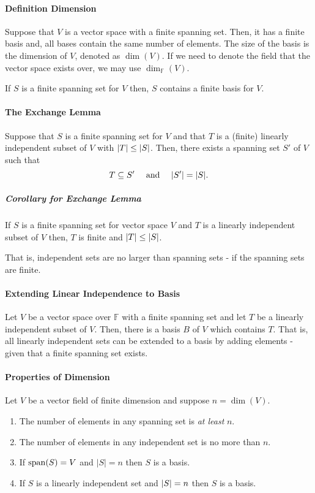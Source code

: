 \paragraph{Definition Dimension}
Suppose that \(V\) is a vector space with a finite spanning set. Then,
it has a finite basis and, all bases contain the same number of elements.
The size of the basis is the dimension of \(V\), denoted as
\(\dim(V)\).
If we need to denote the field that the vector space exists over, we
may use \(\dim_{\mathbb{F}}(V)\).

If \(S\) is a finite spanning set for \(V\) then, \(S\)
contains a finite basis for \(V\).

\paragraph{The Exchange Lemma}
Suppose that \(S\) is a finite spanning set for \(V\) and that \(T\)
is a (finite) linearly independent subset of \(V\) with
\(\abs{T} \leq \abs{S}\).
Then, there exists a spanning set \(S'\) of \(V\)
such that
\[
    T \subseteq S' \quad\text{ and }\quad \abs{S'} = \abs{S}.
\]

\subparagraph{Corollary for Exchange Lemma}
If \(S\) is a finite spanning set for vector space \(V\) and
\(T\) is a linearly independent subset of \(V\) then,
\(T\) is finite and \(\abs{T} \leq \abs{S}\).

That is, independent sets are no larger than spanning sets - if the
spanning sets are finite.

\paragraph{Extending Linear Independence to Basis}
Let \(V\) be a vector space over \(\mathbb{F}\) with a finite spanning set
and let \(T\) be a linearly independent subset of \(V\).
Then, there is a basis \(B\) of \(V\) which contains \(T\).
That is, all linearly independent sets can be extended to a basis by adding
elements - given that a finite spanning set exists.

\paragraph{Properties of Dimension}
Let \(V\) be a vector field of finite dimension and suppose
\(n = \dim (V)\).
\begin{enumerate}
    \item The number of elements in any spanning set is \textit{at least} \(n\).
    \item The number of elements in any independent set is no more than \(n\).
    \item If \(\mathrm{span}(S) = V\) and \(|S| = n\) then \(S\) is a basis.
    \item If \(S\) is a linearly independent set and \(\abs{S} = n\) then
    \(S\) is a basis.
\end{enumerate}

